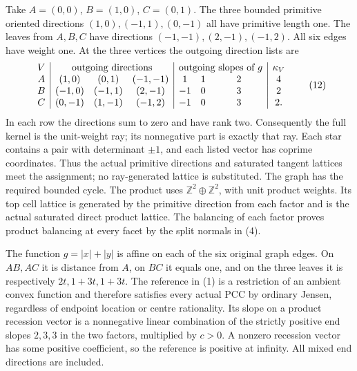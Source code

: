 \documentclass[
  10pt,
]{article}
\begin{document}
Take \(A=(0,0)\), \(B=(1,0)\), \(C=(0,1)\). The three bounded primitive
oriented directions \((1,0),(-1,1),(0,-1)\) all have primitive length
one. The leaves from \(A,B,C\) have directions
\((-1,-1),(2,-1),(-1,2)\). All six edges have weight one. At the three
vertices the outgoing direction lists are \[
 \begin{array}{c|ccc|ccc|c}
 V&\multicolumn{3}{c|}{\text{outgoing directions}}&\multicolumn{3}{c|}{\text{outgoing slopes of }g}&\kappa_V\\
 A&(1,0)&(0,1)&(-1,-1)&1&1&2&4\\
 B&(-1,0)&(-1,1)&(2,-1)&-1&0&3&2\\
 C&(0,-1)&(1,-1)&(-1,2)&-1&0&3&2.
 \end{array}                                                     \tag{12}
\] In each row the directions sum to zero and have rank two.
Consequently the full kernel is the unit-weight ray; its nonnegative
part is exactly that ray. Each star contains a pair with determinant
\(\pm1\), and each listed vector has coprime coordinates. Thus the
actual primitive directions and saturated tangent lattices meet the
assignment; no ray-generated lattice is substituted. The graph has the
required bounded cycle. The product uses
\(\mathbb{Z}^2\oplus\mathbb{Z}^2\), with unit product weights. Its top
cell lattice is generated by the primitive direction from each factor
and is the actual saturated direct product lattice. The balancing of
each factor proves product balancing at every facet by the split normals
in (4).

The function \(g=|x|+|y|\) is affine on each of the six original graph
edges. On \(AB,AC\) it is distance from \(A\), on \(BC\) it equals one,
and on the three leaves it is respectively \(2t,1+3t,1+3t\). The
reference in (1) is a restriction of an ambient convex function and
therefore satisfies every actual PCC by ordinary Jensen, regardless of
endpoint location or centre rationality. Its slope on a product
recession vector is a nonnegative linear combination of the strictly
positive end slopes \(2,3,3\) in the two factors, multiplied by \(c>0\).
A nonzero recession vector has some positive coefficient, so the
reference is positive at infinity. All mixed end directions are
included.
\end{document}
